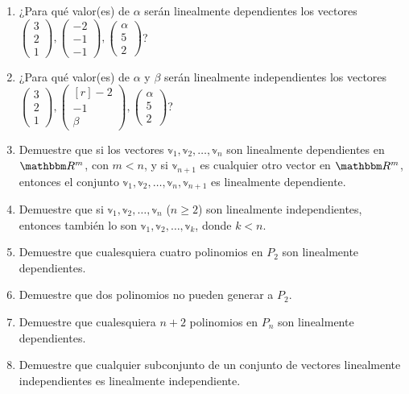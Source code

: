 \begin{enumerate}[start=90]
    \item ¿Para qué valor(es) de $\alpha$ serán linealmente dependientes los vectores $\begin{pmatrix*}3 \\ 2 \\ 1\end{pmatrix*},\begin{pmatrix*}-2 \\ -1 \\ -1\end{pmatrix*},\begin{pmatrix*}\alpha \\ 5 \\ 2\end{pmatrix*}$?
    \item ¿Para qué valor(es) de $\alpha$ y $\beta$ serán linealmente independientes los vectores $\begin{pmatrix*}3 \\ 2 \\ 1\end{pmatrix*},\begin{pmatrix*}[r]-2 \\ -1 \\ \beta\end{pmatrix*},\begin{pmatrix*}\alpha \\ 5 \\ 2\end{pmatrix*}$?
    \item Demuestre que si los vectores $\mathbb{v}_{1}, \mathbb{v}_{2}, \dots, \mathbb{v}_{n}$ son linealmente dependientes en $\RR[m]$, con $m<n$, y si $\mathbb{v}_{n+1}$ es cualquier otro vector en $\RR[m]$, entonces el conjunto $\mathbb{v}_{1}, \mathbb{v}_{2}, \dots, \mathbb{v}_{n}, \mathbb{v}_{n+1}$ es linealmente dependiente.
    \item Demuestre que si $\mathbb{v}_{1}, \mathbb{v}_{2}, \dots, \mathbb{v}_{n}$ ($n \geq 2$) son linealmente independientes, entonces también lo son $\mathbb{v}_{1}, \mathbb{v}_{2}, \dots, \mathbb{v}_{k}$, donde $k<n$.
    \item Demuestre que cualesquiera cuatro polinomios en $P_{2}$ son linealmente dependientes.
    \item Demuestre que dos polinomios no pueden generar a $P_{2}$.
    \item Demuestre que cualesquiera $n+2$ polinomios en $P_{n}$ son linealmente dependientes.
    \item Demuestre que cualquier subconjunto de un conjunto de vectores linealmente independientes es linealmente independiente.

\end{enumerate}
